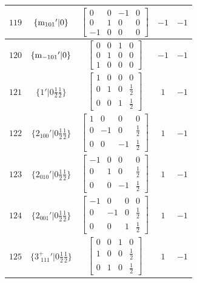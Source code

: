 \documentclass[fleqn,8pt]{jsarticle}
\begin{document}
\begin{longtable}{ccccc}
$ 119 $ & $ \{{\rm m}_{101}{}'|0\} $ & $ \begin{bmatrix} 0 & 0 & -1 & 0 \\ 0 & 1 & 0 & 0 \\ -1 & 0 & 0 & 0 \end{bmatrix} $ & $ -1 $ & $ -1 $ \\ \hline
$ 120 $ & $ \{{\rm m}_{-101}{}'|0\} $ & $ \begin{bmatrix} 0 & 0 & 1 & 0 \\ 0 & 1 & 0 & 0 \\ 1 & 0 & 0 & 0 \end{bmatrix} $ & $ -1 $ & $ -1 $ \\ \hline
$ 121 $ & $ \{1{}'|0 \frac{1}{2} \frac{1}{2}\} $ & $ \begin{bmatrix} 1 & 0 & 0 & 0 \\ 0 & 1 & 0 & \frac{1}{2} \\ 0 & 0 & 1 & \frac{1}{2} \end{bmatrix} $ & $ 1 $ & $ -1 $ \\ \hline
$ 122 $ & $ \{2{}_{100}{}'|0 \frac{1}{2} \frac{1}{2}\} $ & $ \begin{bmatrix} 1 & 0 & 0 & 0 \\ 0 & -1 & 0 & \frac{1}{2} \\ 0 & 0 & -1 & \frac{1}{2} \end{bmatrix} $ & $ 1 $ & $ -1 $ \\ \hline
$ 123 $ & $ \{2{}_{010}{}'|0 \frac{1}{2} \frac{1}{2}\} $ & $ \begin{bmatrix} -1 & 0 & 0 & 0 \\ 0 & 1 & 0 & \frac{1}{2} \\ 0 & 0 & -1 & \frac{1}{2} \end{bmatrix} $ & $ 1 $ & $ -1 $ \\ \hline
$ 124 $ & $ \{2{}_{001}{}'|0 \frac{1}{2} \frac{1}{2}\} $ & $ \begin{bmatrix} -1 & 0 & 0 & 0 \\ 0 & -1 & 0 & \frac{1}{2} \\ 0 & 0 & 1 & \frac{1}{2} \end{bmatrix} $ & $ 1 $ & $ -1 $ \\ \hline
$ 125 $ & $ \{3^{+}_{\,\,111}{}'|0 \frac{1}{2} \frac{1}{2}\} $ & $ \begin{bmatrix} 0 & 0 & 1 & 0 \\ 1 & 0 & 0 & \frac{1}{2} \\ 0 & 1 & 0 & \frac{1}{2} \end{bmatrix} $ & $ 1 $ & $ -1 $ \\ \hline

\end{longtable}
\end{document}
